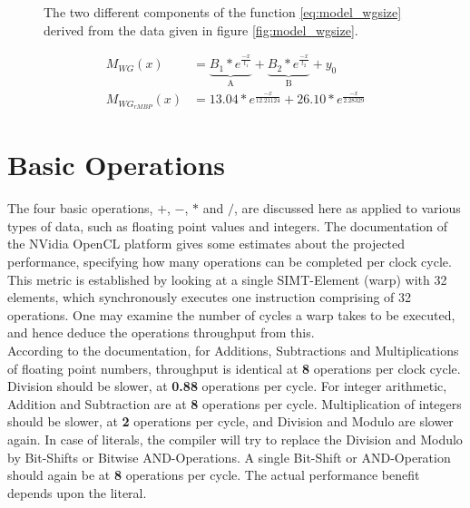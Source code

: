 \begin{figure}[p]
	\begin{center}
		\caption{The two different components of the function \ref{eq:model_wgsize} derived from the data given in figure \ref{fig:model_wgsize}.}
		\label{fig:model_wgsize_components}
	\end{center}
\end{figure}
\begin{align}
\label{eq:model_wgsize} M_{WG}(x) &= \underbrace{B_1*e^{\frac{-x}{t_1}}}_\text{A} + \underbrace{B_2*e^{\frac{-x}{t_2}}}_\text{B}+y_0\\
\label{eq:model_wgsize_mbp} M_{WG_{rMBP}}(x) &= 13.04 * e^{\frac{-x}{12.21124}} + 26.10 * e^{\frac{-x}{2.28329}}
\end{align}

\newpage


\section{Basic Operations}
\label{sect:model_ops}
The four basic operations, $+$, $-$, $*$ and $/$, are discussed here as applied to various types of data, such as floating point values and integers. The documentation of the NVidia OpenCL platform gives some estimates about the projected performance, specifying how many operations can be completed per clock cycle. This metric is established by looking at a single SIMT-Element (warp) with 32 elements, which synchronously executes one instruction comprising of 32 operations. One may examine the number of cycles a warp takes to be executed, and hence deduce the operations throughput from this. \cite{nvidia2009opencl} \\

According to the documentation, for Additions, Subtractions and Multiplications of floating point numbers, throughput is identical at \textbf{8} operations per clock cycle. Division should be slower, at \textbf{0.88} operations per cycle. For integer arithmetic, Addition and Subtraction are at \textbf{8} operations per cycle. Multiplication of integers should be slower, at \textbf{2} operations per cycle, and Division and Modulo are slower again. In case of literals, the compiler will try to replace the Division and Modulo by Bit-Shifts or Bitwise AND-Operations. A single Bit-Shift or AND-Operation should again be at \textbf{8} operations per cycle. The actual performance benefit depends upon the literal.\cite{nvidia2009opencl} \\

